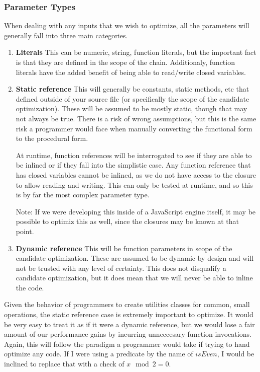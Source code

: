 \subsubsection{Parameter Types}
When dealing with any inputs that we wish to optimize, all the parameters will generally fall into three main categories.

\begin{enumerate}
  \item \textbf{Literals}
    This can be numeric, string, function literals, but the important fact is that they are defined in the scope of the chain.  Additionaly, function literals have the added benefit of being able to read/write closed variables.

  \item \textbf{Static reference}
    This will generally be constants, static methods, etc that defined outside of your source file (or specifically the scope of the candidate optimization).  These will be assumed to be mostly static, though that may not always be true.  There is a risk of wrong assumptions, but this is the same risk a programmer would face when manually converting the functional form to the procedural form.  
    
    At runtime, function references will be interrogated to see if they are able to be inlined or if they fall into the simplistic case.  Any function reference that has closed variables cannot be inlined, as we do not have access to the closure to allow reading and writing.  This can only be tested at runtime, and so this is by far the most complex parameter type.  
    
    Note: If we were developing this inside of a JavaScript engine itself, it may be possible to optimiz this as well, since the closures may be known at that point.

  \item \textbf{Dynamic reference}
    This will be function parameters in scope of the candidate optimization. These are assumed to be dynamic by design and will not be trusted with any level of certainty.  This does not disqualify a candidate optimization, but it does mean that we will never be able to inline the code.
\end{enumerate}

Given the behavior of programmers to create utilities classes for common, small operations, the static reference case is extremely important to optimize.  It would be very easy to treat it as if it were a dynamic reference, but we would lose a fair amount of our performance gains by incurring unneccesary function invocations.  Again, this will follow the paradigm a programmer would take if trying to hand optimize any code.  If I were using a predicate by the name of $isEven$, I would be inclined to replace that with a check of $x \mod 2 = 0$. 
